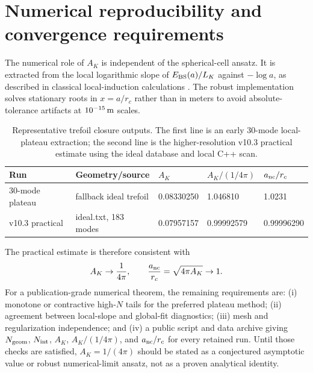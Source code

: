 \documentclass[aps,pra,preprint,longbibliography,nofootinbib]{revtex4-2}
\begin{document}
\section{Numerical reproducibility and convergence requirements}
\label{app:numerics}

The numerical role of $A_K$ is independent of the spherical-cell ansatz.  It
is extracted from the local logarithmic slope of $E_{\rm BS}(a)/L_K$ against
$-\log a$, as described in classical local-induction calculations
\cite{Saffman1992}.  The robust implementation solves stationary roots in
$x=a/r_c$ rather than in meters to avoid absolute-tolerance artifacts at
$10^{-15}\,{\rm m}$ scales.

\begin{table}[h]
\centering
\caption{Representative trefoil closure outputs.  The first line is an early
30-mode local-plateau extraction; the second line is the higher-resolution
v10.3 practical estimate using the ideal database and local C++ scan.}
\label{tab:app_numerics}
\begin{tabular}{lllll}
\toprule
Run & Geometry/source & $A_K$ & $A_K/(1/4\pi)$ & $a_{\rm nc}/r_c$ \\
\midrule
30-mode plateau & fallback ideal trefoil & 0.08330250 & 1.046810 & 1.0231 \\
v10.3 practical & ideal.txt, 183 modes & 0.07957157 & 0.99992579 & 0.99996290 \\
\bottomrule
\end{tabular}
\end{table}

The practical estimate is therefore consistent with
\begin{equation}
  A_K\to\frac{1}{4\pi},
  \qquad
  \frac{a_{\rm nc}}{r_c}=\sqrt{4\pi A_K}\to1 .
  \label{eq:app_AK_limit}
\end{equation}
For a publication-grade numerical theorem, the remaining requirements are:
(i) monotone or contractive high-$N$ tails for the preferred plateau method;
(ii) agreement between local-slope and global-fit diagnostics; (iii) mesh and
regularization independence; and (iv) a public script and data archive giving
$N_{\rm geom}$, $N_{\rm int}$, $A_K$, $A_K/(1/4\pi)$, and
$a_{\rm nc}/r_c$ for every retained run.  Until those checks are satisfied,
$A_K=1/(4\pi)$ should be stated as a conjectured asymptotic value or robust
numerical-limit ansatz, not as a proven analytical identity.
\end{document}

